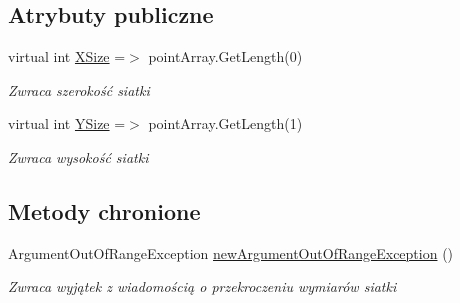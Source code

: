 \subsection*{Atrybuty publiczne}
\begin{DoxyCompactItemize}
\item 
virtual int \hyperlink{class_convay_1_1_core_1_1_array_grid_a4850c93797b02a67509f068bb3c2b0c0}{X\+Size} =$>$ point\+Array.\+Get\+Length(0)
\begin{DoxyCompactList}\small\item\em Zwraca szerokość siatki \end{DoxyCompactList}\item 
virtual int \hyperlink{class_convay_1_1_core_1_1_array_grid_a315d51b878cb8952f0578cffd13546bd}{Y\+Size} =$>$ point\+Array.\+Get\+Length(1)
\begin{DoxyCompactList}\small\item\em Zwraca wysokość siatki \end{DoxyCompactList}\end{DoxyCompactItemize}
\subsection*{Metody chronione}
\begin{DoxyCompactItemize}
\item 
Argument\+Out\+Of\+Range\+Exception \hyperlink{class_convay_1_1_core_1_1_array_grid_a3d6803d7c51929e3a26c57a7f0dc87e1}{new\+Argument\+Out\+Of\+Range\+Exception} ()
\begin{DoxyCompactList}\small\item\em Zwraca wyjątek z wiadomością o przekroczeniu wymiarów siatki \end{DoxyCompactList}\end{DoxyCompactItemize}
